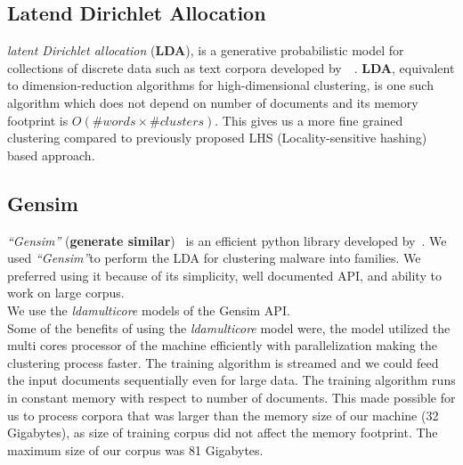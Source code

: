 \subsection{Latend Dirichlet Allocation}
\label{sub:Latend Dirichlet Allocation}
\textit{latent Dirichlet allocation} (\textbf{LDA}), is a generative probabilistic model for collections of discrete data such as text corpora developed by~\citeauthor{Blei}~\cite[LDA]{Blei}.
\textbf{LDA}, equivalent to dimension-reduction algorithms for high-dimensional clustering, is one such algorithm which does not depend on number of documents and its memory footprint is $O(\#words\times \#clusters)$.
This gives us a more fine grained clustering compared to previously proposed LHS (Locality-sensitive hashing) based approach.\\
\subsection{Gensim}
\label{sub:Gensim}
\emph{``Gensim''} (\textbf{generate similar})~\cite[]{gensim} is an efficient python library developed by~\citeauthor{gensim}.
We used \emph{``Gensim''}to perform the LDA for clustering malware into families.
We preferred using it because of its simplicity, well documented API, and ability to work on large corpus.\\
We use the \emph{ldamulticore}\cite[]{ldamulticore}  models of the Gensim API.\\
Some of the benefits of using the \emph{ldamulticore} model were, the model utilized the multi cores processor of the machine efficiently with parallelization making the clustering process faster.
The training algorithm is streamed and we could feed the input documents sequentially even for large data.
The training algorithm runs in constant memory with respect to number of documents.
This made possible for us to process corpora that was larger than the memory size of our machine (32 Gigabytes), as size of training corpus did not affect the memory footprint.
The maximum size of our corpus was 81 Gigabytes.

